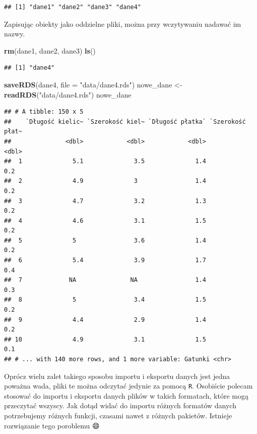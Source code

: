 \documentclass[]{book}
\newenvironment{Shaded}{\begin{snugshade}}{\end{snugshade}}
\newcommand{\DataTypeTok}[1]{\textcolor[rgb]{0.13,0.29,0.53}{#1}}
\newcommand{\KeywordTok}[1]{\textcolor[rgb]{0.13,0.29,0.53}{\textbf{#1}}}
\newcommand{\NormalTok}[1]{#1}
\newcommand{\StringTok}[1]{\textcolor[rgb]{0.31,0.60,0.02}{#1}}
\theoremstyle{plain}
\theoremstyle{definition}
\begin{document}
\begin{verbatim}
## [1] "dane1" "dane2" "dane3" "dane4"
\end{verbatim}

Zapisując obiekty jako oddzielne pliki, można przy wczytywaniu nadawać im nazwy.

\begin{Shaded}
\begin{Highlighting}[]
\KeywordTok{rm}\NormalTok{(dane1, dane2, dane3)}
\KeywordTok{ls}\NormalTok{()}
\end{Highlighting}
\end{Shaded}

\begin{verbatim}
## [1] "dane4"
\end{verbatim}

\begin{Shaded}
\begin{Highlighting}[]
\KeywordTok{saveRDS}\NormalTok{(dane4, }\DataTypeTok{file =} \StringTok{"data/dane4.rds"}\NormalTok{)}
\NormalTok{nowe_dane <-}\StringTok{ }\KeywordTok{readRDS}\NormalTok{(}\StringTok{"data/dane4.rds"}\NormalTok{)}
\NormalTok{nowe_dane}
\end{Highlighting}
\end{Shaded}

\begin{verbatim}
## # A tibble: 150 x 5
##    `Długość kielic~ `Szerokość kiel~ `Długość płatka` `Szerokość płat~
##               <dbl>            <dbl>            <dbl>            <dbl>
##  1              5.1              3.5              1.4              0.2
##  2              4.9              3                1.4              0.2
##  3              4.7              3.2              1.3              0.2
##  4              4.6              3.1              1.5              0.2
##  5              5                3.6              1.4              0.2
##  6              5.4              3.9              1.7              0.4
##  7             NA               NA                1.4              0.3
##  8              5                3.4              1.5              0.2
##  9              4.4              2.9              1.4              0.2
## 10              4.9              3.1              1.5              0.1
## # ... with 140 more rows, and 1 more variable: Gatunki <chr>
\end{verbatim}

Oprócz wielu zalet takiego sposobu importu i eksportu danych jest jedna poważna wada, pliki te można odczytać jedynie za pomocą \texttt{R}. Osobiście polecam stosować do importu i eksportu danych plików w takich formatach, które mogą przeczytać wszyscy. Jak dotąd widać do importu różnych formatów danych potrzebujemy różnych funkcji, czasami nawet z różnych pakietów. Istnieje rozwiązanie tego poroblemu 😄
\end{document}
